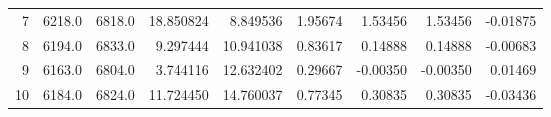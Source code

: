 \begin{longtable}{rrrrrrrrr}
           7 &          6218.0 &          6818.0 &           18.850824 &              8.849536 &                           1.95674 &                                            1.53456 &                                            1.53456 &                                           -0.01875 \\
           8 &          6194.0 &          6833.0 &            9.297444 &             10.941038 &                           0.83617 &                                            0.14888 &                                            0.14888 &                                           -0.00683 \\
           9 &          6163.0 &          6804.0 &            3.744116 &             12.632402 &                           0.29667 &                                           -0.00350 &                                           -0.00350 &                                            0.01469 \\
          10 &          6184.0 &          6824.0 &           11.724450 &             14.760037 &                           0.77345 &                                            0.30835 &                                            0.30835 &                                           -0.03436 \\
\end{longtable}
